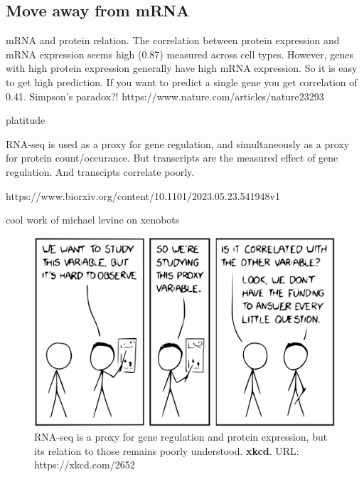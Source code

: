 \subsection{Move away from mRNA}

mRNA and protein relation.
The correlation between protein expression and mRNA expression seems high (0.87) measured across cell types. However, genes with high protein expression generally have high mRNA expression. So it is easy to get high prediction. If you want to predict a single gene you get correlation of 0.41. Simpson's paradox?!
https://www.nature.com/articles/nature23293

platitude

RNA-seq is used as a proxy for gene regulation, and simultaneously as a proxy for protein count/occurance. But transcripts are the measured effect of gene regulation. And transcipts correlate poorly.

https://www.biorxiv.org/content/10.1101/2023.05.23.541948v1

cool work of michael levine on xenobots


\begin{figure}[H]
    \includegraphics[width=\linewidth]{ch.discussion/imgs/xkcd.png}
    \caption{RNA-seq is a proxy for gene regulation and protein expression, but its relation to those remains poorly understood. \textbf{xkcd}. URL: https://xkcd.com/2652}
    \label{fig:xkcd}
\end{figure}


